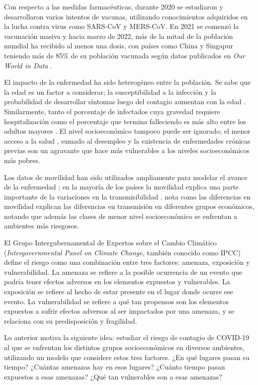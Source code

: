 \begin{intro}
Con respecto a las medidas farmacéuticas, durante 2020 se estudiaron y desarrollaron varios intentos de vacunas, utilizando conocimientos adquiridos en la lucha contra virus como SARS-CoV y MERS-CoV. En 2021 se comenzó la vacunación masiva y hacia marzo de 2022, más de la mitad de la población mundial ha recibido al menos una dosis, con países como China y Singapur teniendo más de 85\% de su población vacunada según datos publicados en \textit{Our World in Data} \cite{Mathieu2021}.

El impacto de la enfermedad ha sido heterogéneo entre la población. Se sabe que la edad es un factor a considerar; la susceptibilidad a la infección y la probabilidad de desarrollar síntomas luego del contagio aumentan con la edad \cite{Davies2020}. Similarmente, tanto el porcentaje de infectados cuya gravedad requiere hospitalización como el porcentaje que termina falleciendo es más alto entre los adultos mayores \cite{Verity2020}. El nivel socioeconómico tampoco puede ser ignorado; el menor acceso a la salud \cite{Wang2020}, sumado al desempleo y la existencia de enfermedades crónicas previas \cite{Ahmed2020} son un agravante que hace más vulnerables a los niveles socioeconómicos más pobres.

Los datos de movilidad han sido utilizados ampliamente para modelar el avance de la enfermedad \cite{Lai2020}\cite{Kraemer2020}\cite{Chinazzi2020}; en la mayoría de los países la movilidad explica una parte importante de la variaciones en la transmisibilidad \cite{Nouvellet2021}. \cite{Chang2021} nota como las diferencias en movilidad explican las diferencias en transmisión en diferentes grupos económicos, notando que además las clases de menor nivel socioeconómico se enfrentan a ambientes más riesgosos.


El Grupo Intergubernamental de Expertos sobre el Cambio Climático (\textit{Intergovernmental Panel on Climate Change}, también conocido como IPCC) define \cite{Field2012} el riesgo como una combinación entre tres factores: amenaza, exposición y vulnerabilidad. La amenaza se refiere a la posible ocurrencia de un evento que podría tener efectos adversos en los elementos expuestos y vulnerables. La exposición se refiere al hecho de estar presente en el lugar donde ocurre ese evento. La vulnerabilidad se refiere a qué tan propensos son los elementos expuestos a sufrir efectos adversos al ser impactados por una amenaza, y se relaciona con su predisposición y fragilidad.

Lo anterior motiva la siguiente idea: estudiar el riesgo de contagio de COVID-19 al que se enfrentan los distintos grupos socioeconómicos en diversos ambientes, utilizando un modelo que considere estos tres factores. ¿En qué lugares pasan su tiempo? ¿Cuántas amenazas hay en esos lugares? ¿Cuánto tiempo pasan expuestos a esas amenazas? ¿Qué tan vulnerables son a esas amenazas? 


\end{intro}
